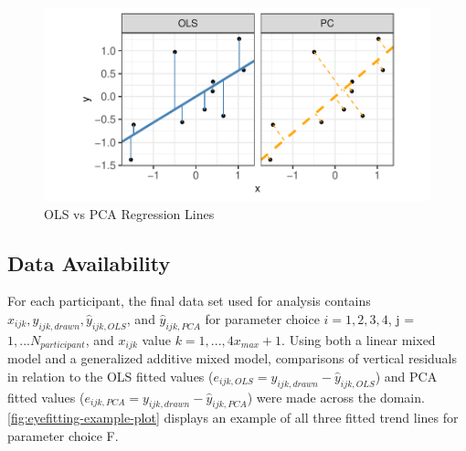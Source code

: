 \documentclass[12pt]{article}
\begin{document}
\begin{figure}[tbp]

{\centering \includegraphics[width=1\linewidth,]{Eye-Fitting-Straight-Lines-in-the-Modern-Era_files/figure-latex/ols-vs-pca-example-1} 

}

\caption{OLS vs PCA Regression Lines}\label{fig:ols-vs-pca-example}
\end{figure}

\hypertarget{data-availability}{%
\subsection{Data Availability}\label{data-availability}}

For each participant, the final data set used for analysis contains
\(x_{ijk}, y_{ijk,drawn}, \hat y_{ijk,OLS}\), and \(\hat y_{ijk,PCA}\)
for parameter choice \(i = 1,2,3,4\), j = \(1,...N_{participant}\), and
\(x_{ijk}\) value \(k = 1, ...,4 x_{max} + 1\). Using both a linear
mixed model and a generalized additive mixed model, comparisons of
vertical residuals in relation to the OLS fitted values
(\(e_{ijk,OLS} = y_{ijk,drawn} - \hat y_{ijk,OLS}\)) and PCA fitted
values (\(e_{ijk,PCA} = y_{ijk,drawn} - \hat y_{ijk,PCA}\)) were made
across the domain. \cref{fig:eyefitting-example-plot} displays an
example of all three fitted trend lines for parameter choice F.
\end{document}
